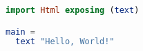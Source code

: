 \documentclass[12pt]{article}
\begin{document}
\begin{lstlisting}[language=elm]
import Html exposing (text)

main =
  text "Hello, World!"
\end{lstlisting}
\end{document}
